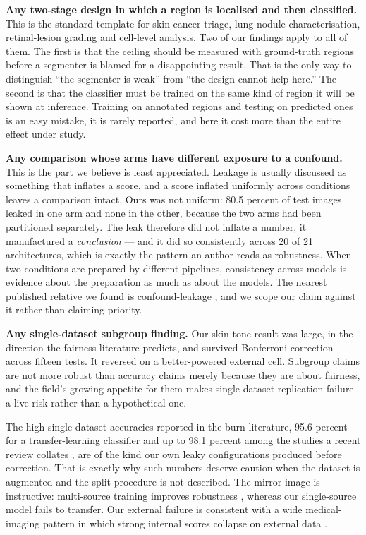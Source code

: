 \documentclass{melba}
\begin{document}
\textbf{Any two-stage design in which a region is localised and then classified.} This is the standard template for skin-cancer triage, lung-nodule characterisation, retinal-lesion grading and cell-level analysis. Two of our findings apply to all of them. The first is that the ceiling should be measured with ground-truth regions before a segmenter is blamed for a disappointing result. That is the only way to distinguish ``the segmenter is weak'' from ``the design cannot help here.'' The second is that the classifier must be trained on the same kind of region it will be shown at inference. Training on annotated regions and testing on predicted ones is an easy mistake, it is rarely reported, and here it cost more than the entire effect under study.

\textbf{Any comparison whose arms have different exposure to a confound.} This is the part we believe is least appreciated. Leakage is usually discussed as something that inflates a score, and a score inflated uniformly across conditions leaves a comparison intact. Ours was not uniform: 80.5 percent of test images leaked in one arm and none in the other, because the two arms had been partitioned separately. The leak therefore did not inflate a number, it manufactured a \emph{conclusion} --- and it did so consistently across 20 of 21 architectures, which is exactly the pattern an author reads as robustness. When two conditions are prepared by different pipelines, consistency across models is evidence about the preparation as much as about the models. The nearest published relative we found is confound-leakage \citep{hamdan2023}, and we scope our claim against it rather than claiming priority.

\textbf{Any single-dataset subgroup finding.} Our skin-tone result was large, in the direction the fairness literature predicts, and survived Bonferroni correction across fifteen tests. It reversed on a better-powered external cell. Subgroup claims are not more robust than accuracy claims merely because they are about fairness, and the field's growing appetite for them makes single-dataset replication failure a live risk rather than a hypothetical one.

The high single-dataset accuracies reported in the burn literature, 95.6 percent for a transfer-learning classifier \citep{suha} and up to 98.1 percent among the studies a recent review collates \citep{fu2026review}, are of the kind our own leaky configurations produced before correction. That is exactly why such numbers deserve caution when the dataset is augmented and the split procedure is not described. The mirror image is instructive: multi-source training improves robustness \citep{elsarta2025}, whereas our single-source model fails to transfer. Our external failure is consistent with a wide medical-imaging pattern in which strong internal scores collapse on external data \citep{zech2018,yu2022,martensson2020,roberts}.
\end{document}
